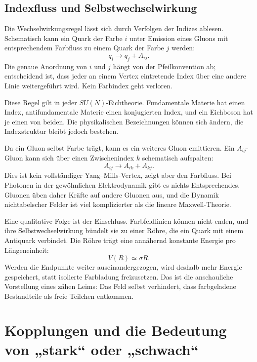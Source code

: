 \subsection{Indexfluss und Selbstwechselwirkung}

Die Wechselwirkungsregel lässt sich durch Verfolgen der Indizes ablesen. Schematisch kann ein Quark der Farbe \(i\) unter Emission eines Gluons mit entsprechendem Farbfluss zu einem Quark der Farbe \(j\) werden:
\begin{equation}
q_i\longrightarrow q_j+A_{ij}.
\label{eq:l5-quark-gluon-vertex}
\end{equation}
Die genaue Anordnung von \(i\) und \(j\) hängt von der Pfeilkonvention ab; entscheidend ist, dass jeder an einem Vertex eintretende Index über eine andere Linie weitergeführt wird. Kein Farbindex geht verloren.

Diese Regel gilt in jeder \(SU(N)\)-Eichtheorie. Fundamentale Materie hat einen Index, antifundamentale Materie einen konjugierten Index, und ein Eichboson hat je einen von beiden. Die physikalischen Bezeichnungen können sich ändern, die Indexstruktur bleibt jedoch bestehen.

Da ein Gluon selbst Farbe trägt, kann es ein weiteres Gluon emittieren. Ein \(A_{ij}\)-Gluon kann sich über einen Zwischenindex \(k\) schematisch aufspalten:
\begin{equation}
A_{ij}\longrightarrow A_{ik}+A_{kj}.
\label{eq:l5-three-gluon-index}
\end{equation}
Dies ist kein vollständiger Yang--Mills-Vertex, zeigt aber den Farbfluss. Bei Photonen in der gewöhnlichen Elektrodynamik gibt es nichts Entsprechendes. Gluonen üben daher Kräfte auf andere Gluonen aus, und die Dynamik nichtabelscher Felder ist viel komplizierter als die lineare Maxwell-Theorie.

Eine qualitative Folge ist der Einschluss. Farbfeldlinien können nicht enden, und ihre Selbstwechselwirkung bündelt sie zu einer Röhre, die ein Quark mit einem Antiquark verbindet. Die Röhre trägt eine annähernd konstante Energie pro Längeneinheit:
\begin{equation}
V(R)\simeq \sigma R.
\end{equation}
Werden die Endpunkte weiter auseinandergezogen, wird deshalb mehr Energie gespeichert, statt isolierte Farbladung freizusetzen. Das ist die anschauliche Vorstellung eines zähen Leims: Das Feld selbst verhindert, dass farbgeladene Bestandteile als freie Teilchen entkommen.

\section{Kopplungen und die Bedeutung von „stark“ oder „schwach“}

